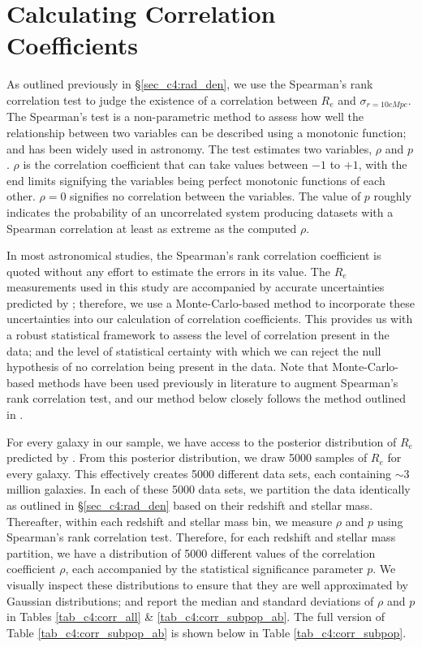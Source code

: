 \section{Calculating Correlation Coefficients \label{sec_c4:ap:corr_coeff}}

As outlined previously in \S \ref{sec_c4:rad_den}, we use the Spearman's rank correlation test \citep{spearman_original} to judge the existence of a correlation between $R_e$ and $\sigma_{r=10cMpc}$. The Spearman's test is a non-parametric method to assess how well the relationship between two variables can be described using a monotonic function; and has been widely used in astronomy. The test estimates two variables, $\rho$ and $p$. $\rho$ is the correlation coefficient that can take values between $-1$ to $+1$, with the end limits signifying the variables being perfect monotonic functions of each other. $\rho=0$ signifies no correlation between the variables. The value of $p$ roughly indicates the probability of an uncorrelated system producing datasets with a Spearman correlation at least as extreme as the computed $\rho$.

In most astronomical studies, the Spearman's rank correlation coefficient is quoted without any effort to estimate the errors in its value. The $R_e$ measurements used in this study are accompanied by accurate uncertainties predicted by \gampen{}; therefore, we use a Monte-Carlo-based method to incorporate these uncertainties into our calculation of correlation coefficients. This provides us with a robust statistical framework to assess the level of correlation present in the data; and the level of statistical certainty with which we can reject the null hypothesis of no correlation being present in the data. Note that Monte-Carlo-based methods have been used previously in literature to augment Spearman's rank correlation test, and our method below closely follows the method outlined in \citet{curran_14}.

For every galaxy in our sample, we have access to the posterior distribution of $R_e$ predicted by \gampen{}. From this posterior distribution, we draw 5000 samples of $R_e$ for every galaxy. This effectively creates 5000 different data sets, each containing $\sim3$ million galaxies. In each of these 5000 data sets, we partition the data identically as outlined in \S \ref{sec_c4:rad_den} based on their redshift and stellar mass. Thereafter, within each redshift and stellar mass bin, we measure $\rho$ and $p$ using Spearman's rank correlation test. Therefore, for each redshift and stellar mass partition, we have a distribution of 5000 different values of the correlation coefficient $\rho$, each accompanied by the statistical significance parameter $p$. We visually inspect these distributions to ensure that they are well approximated by Gaussian distributions; and report the median and standard deviations of $\rho$ and $p$ in Tables \ref{tab_c4:corr_all} \& \ref{tab_c4:corr_subpop_ab}. The full version of Table \ref{tab_c4:corr_subpop_ab} is shown below in Table \ref{tab_c4:corr_subpop}. 


